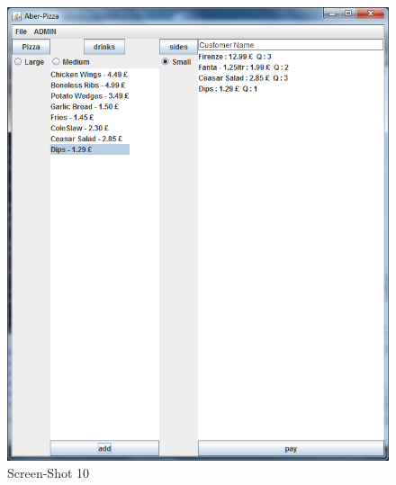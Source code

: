 \documentclass[11pt,a4paper]{article}
\begin{document}
\begin{flushleft}
\begin{figure}[ht]
	\centering
 	\includegraphics[scale = 0.4]{../Sceenshots/Capture9.PNG} 
	\caption{Screen-Shot 10}
\end{figure}


\end{flushleft}
\end{document}
